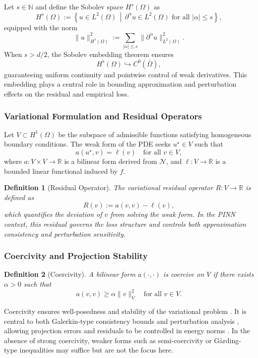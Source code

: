 \documentclass[11pt, a4paper]{article}
\newtheorem{defn}{Definition}%
\begin{document}
Let $s \in \mathbb{N}$ and define the Sobolev space $H^s(\Omega)$ as
\[
H^s(\Omega) := \left\{ u \in L^2(\Omega) \,\middle|\, \partial^\alpha u \in L^2(\Omega) \text{ for all } |\alpha| \leq s \right\},
\]
equipped with the norm
\[
\|u\|_{H^s(\Omega)}^2 := \sum_{|\alpha| \leq s} \| \partial^\alpha u \|_{L^2(\Omega)}^2.
\]
When $s > d/2$, the Sobolev embedding theorem ensures
\[
H^s(\Omega) \hookrightarrow C^0(\bar{\Omega}),
\]
guaranteeing uniform continuity and pointwise control of weak derivatives. This embedding plays a central role in bounding approximation and perturbation effects on the residual and empirical loss.

\subsubsection{Variational Formulation and Residual Operators}

Let $V \subset H^1(\Omega)$ be the subspace of admissible functions satisfying homogeneous boundary conditions. The weak form of the PDE seeks $u^\star \in V$ such that
\[
a(u^\star, v) = \ell(v) \quad \text{for all } v \in V,
\]
where $a \colon V \times V \to \mathbb{R}$ is a bilinear form derived from $\mathcal{N}$, and $\ell \colon V \to \mathbb{R}$ is a bounded linear functional induced by $f$.

\begin{defn}[Residual Operator]
The variational residual operator $R \colon V \to \mathbb{R}$ is defined as
\[
R(v) := a(v, v) - \ell(v),
\]
which quantifies the deviation of $v$ from solving the weak form. In the PINN context, this residual governs the loss structure and controls both approximation consistency and perturbation sensitivity.
\end{defn}

\subsubsection{Coercivity and Projection Stability}

\begin{defn}[Coercivity]
A bilinear form $a(\cdot, \cdot)$ is coercive on $V$ if there exists $\alpha > 0$ such that
\[
a(v, v) \geq \alpha \|v\|_V^2 \quad \text{for all } v \in V.
\]
\end{defn}Coercivity ensures well-posedness and stability of the variational problem \cite{stuart2010}. It is central to both Galerkin-type consistency bounds and perturbation analysis \cite{adams2003}, allowing projection errors and residuals to be controlled in energy norms \cite{quarteroni2008}. In the absence of strong coercivity, weaker forms such as semi-coercivity or Gårding-type inequalities may suffice but are not the focus here.
\end{document}
